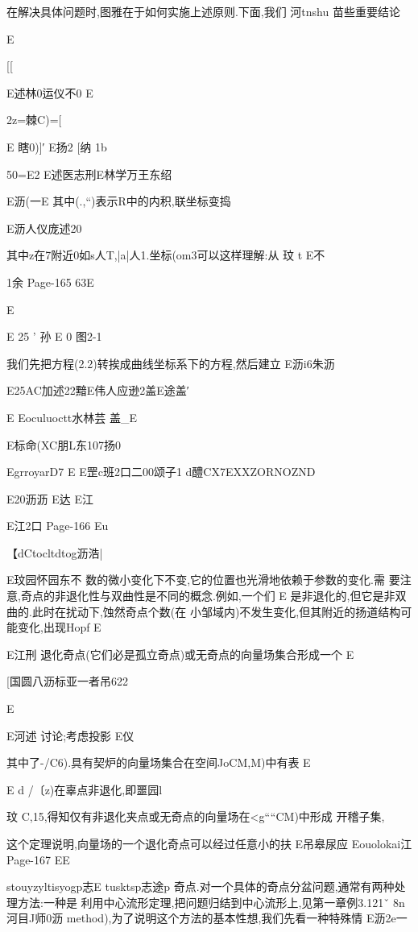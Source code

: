 {{{{{{{{{{{{{{{{{在解决具体问题时,图雅在于如何实施上述原则.下面,我们
河tnshu
苗些重要结论

E

[[

E述林0运仪不0
E

2z=棘C)=[

E
瞎0)]′
E扬2
[纳
1b

50=E2
E述医志刑E林学万王东绍

E沥(一E
其中(.,“)表示R中的内积,联坐标变捣

E沥人仪庞述20

其中z在7附近0如s人T,|a|人1.坐标(om3可以这样理解:从
玟
t
E不

1余
Page-165
63E

E

E
25
'
孙
E
0
图2-1

我们先把方程(2.2)转挨成曲线坐标系下的方程,然后建立
E沥i6朱沥

E25AC加述22黯E伟人应逊2盖E途盖′

E
Eoculuoctt水林芸
盖_E

E标命(XC朋L东107扬0

EgrroyarD7
E
E罡c班2口二00颂子1
d醴CX7EXXZORNOZND

E20沥沥
E达
E江

E江2口
Page-166
Eu

【dCtocltdtog沥浩|

E玟园怀园东不
数的微小变化下不变,它的位置也光滑地依赖于参数的变化.需
要注意,奇点的非退化性与双曲性是不同的概念.例如,一个们
E
是非退化的,但它是非双曲的.此时在扰动下,蚀然奇点个数(在
小邹域内)不发生变化,但其附近的扬道结构可能变化,出现Hopf
E

E江刑
退化奇点(它们必是孤立奇点)或无奇点的向量场集合形成一个
E

[国圆八沥标亚一者吊622

E

E河述
讨论;考虑投影
E仪

其中了-/C6).具有契炉的向量场集合在空间JoCM,M)中有表
E

E
d
/〔z)在辜点非退化,即噩园l

玟
C,15,得知仅有非退化夹点或无奇点的向量场在<g““CM)中形成
开稽子集,

这个定理说明,向量场的一个退化奇点可以经过任意小的扶
E吊皋尿应
Eouolokai江
Page-167
EE

stouyzyltisyogp志E
tusktsp志途p
奇点.对一个具体的奇点分盆问题,通常有两种处理方法:一种是
利用中心流形定理,把问题归结到中心流形上,见第一章例3.121ˇ
8n河目J师0沥
method),为了说明这个方法的基本性想,我们先看一种特殊情
E沥2e一

}}}}}}}}}}}}}}}}}
